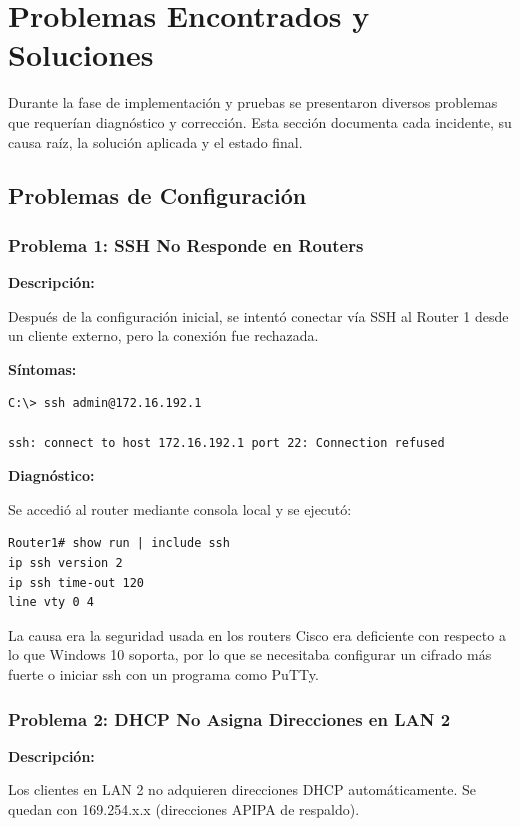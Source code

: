 \section{Problemas Encontrados y Soluciones}

Durante la fase de implementación y pruebas se presentaron diversos problemas que
requerían diagnóstico y corrección. Esta sección documenta cada incidente, su
causa raíz, la solución aplicada y el estado final.

\subsection{Problemas de Configuración}

\subsubsection{Problema 1: SSH No Responde en Routers}

\textbf{Descripción:}

Después de la configuración inicial, se intentó conectar vía SSH al Router 1
desde un cliente externo, pero la conexión fue rechazada.

\textbf{Síntomas:}

\begin{verbatim}
C:\> ssh admin@172.16.192.1

ssh: connect to host 172.16.192.1 port 22: Connection refused
\end{verbatim}

\textbf{Diagnóstico:}

Se accedió al router mediante consola local y se ejecutó:

\begin{verbatim}
Router1# show run | include ssh
ip ssh version 2
ip ssh time-out 120
line vty 0 4
\end{verbatim}

La causa era la seguridad usada en los routers Cisco era deficiente con respecto a lo que Windows 10 soporta, por lo que se necesitaba configurar un cifrado más fuerte o iniciar ssh con un programa como PuTTy.

\subsubsection{Problema 2: DHCP No Asigna Direcciones en LAN 2}

\textbf{Descripción:}

Los clientes en LAN 2 no adquieren direcciones DHCP automáticamente. Se quedan
con 169.254.x.x (direcciones APIPA de respaldo).


